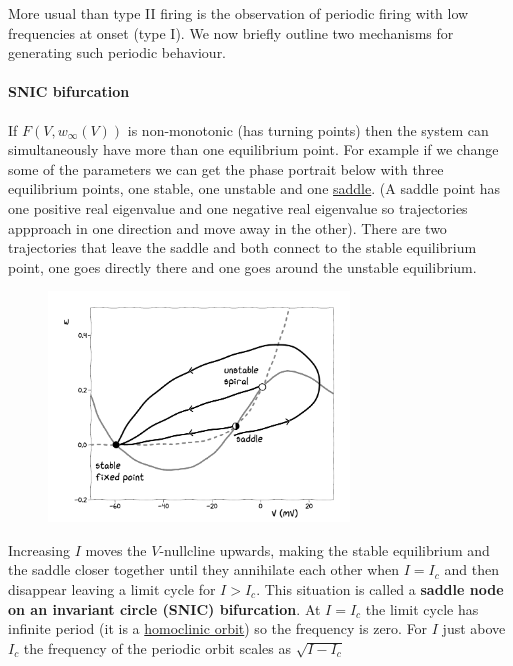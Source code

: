 \documentclass[11pt]{article}
\begin{document}
More usual than type II firing is the observation of periodic firing
with low frequencies at onset (type I). We now briefly outline two
mechanisms for generating such periodic behaviour.

\hypertarget{snic-bifurcation}{%
\paragraph{SNIC bifurcation}\label{snic-bifurcation}}

If \(F(V, w_\infty(V))\) is non-monotonic (has turning points) then the
system can simultaneously have more than one equilibrium point. For
example if we change some of the parameters we can get the phase
portrait below with three equilibrium points, one stable, one unstable
and one \href{https://en.wikipedia.org/wiki/Equilibrium_point}{saddle}.
(A saddle point has one positive real eigenvalue and one negative real
eigenvalue so trajectories appproach in one direction and move away in
the other). There are two trajectories that leave the saddle and both
connect to the stable equilibrium point, one goes directly there and one
goes around the unstable equilibrium.

\begin{figure}
  \centering
  \includegraphics[width=8cm]{SNIC.png}
\end{figure}

Increasing \(I\) moves the \(V\)-nullcline upwards, making the stable
equilibrium and the saddle closer together until they annihilate each
other when \(I=I_c\) and then disappear leaving a limit cycle for
\(I>I_c\). This situation is called a \textbf{saddle node on an
invariant circle (SNIC) bifurcation}. At \(I=I_c\) the limit cycle has
infinite period (it is a
\href{https://en.wikipedia.org/wiki/Homoclinic_orbit}{homoclinic orbit})
so the frequency is zero. For \(I\) just above \(I_c\) the frequency of
the periodic orbit scales as \(\sqrt{I-I_c}\)
\end{document}
